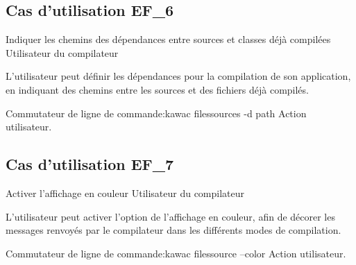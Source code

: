 \subsection{Cas d'utilisation EF\_6}
\fiche
{Indiquer les chemins des dépendances entre sources et classes déjà compilées}          %
{Utilisateur du compilateur}                               %
{                                                %
   
L'utilisateur peut définir les dépendances pour la compilation de son application, en indiquant des chemins entre les sources et des fichiers déjà compilés.}
{
  
}                                                %
{Commutateur de ligne de commande:kawac filessources -d path}                             %
{Action utilisateur.}                       %
{                                                %
 
}{} %
{} %

\subsection{Cas d'utilisation EF\_7}
\fiche
{Activer l'affichage en couleur}          %
{Utilisateur du compilateur}                               %
{                                                %
   
  L'utilisateur peut activer l'option de l'affichage en couleur, afin de décorer les messages renvoyés par le compilateur dans les différents modes de compilation.   
}
{
  
}                                                %
{Commutateur de ligne de commande:kawac filessource --color}                             %
{Action utilisateur.}                       %
{                                                %
 
}{} %
{} %
